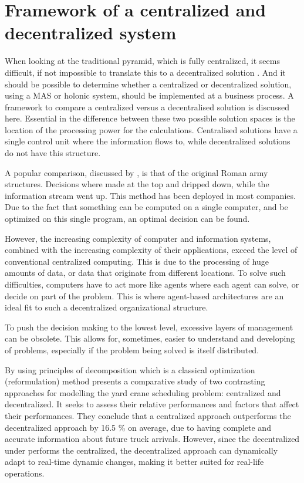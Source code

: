\section{Framework of a centralized and decentralized system}
When looking at the traditional pyramid, which is fully centralized, it seems difficult, if not impossible to translate this to a decentralized solution . And it should be possible to determine whether a centralized or decentralized solution, using a MAS or holonic system, should be implemented at a business process. A framework to compare a centralized versus a decentralised solution is discussed here. Essential in the difference between these two possible solution spaces is the location of the processing power for the calculations. Centralised solutions have a single control unit where the information flows to, while decentralized solutions do not have this structure.

A popular comparison, discussed by \citet{parunak1999industrial}, is that of the original Roman army structures. Decisions where made at the top and dripped down, while the information stream went up. This method has been deployed in most companies. Due to the fact that something can be computed on a single computer, and be optimized on this single program, an optimal decision can be found.

However, the increasing complexity of computer and information systems, combined with the increasing complexity of their applications, exceed the level of conventional centralized computing. This is due to the processing of huge amounts of data, or data that originate from different locations. To solve such difficulties, computers have to act more like agents where each agent can solve, or decide on part of the problem. This is where agent-based architectures are an ideal fit to such a decentralized organizational structure.

To push the decision making to the lowest level, excessive layers of management can be obsolete. This allows for, sometimes, easier to understand and developing of problems, especially if the problem being solved is itself distributed.

By using principles of decomposition which is a classical optimization (reformulation) method \citep{sharif2012yard} presents a comparative study of two contrasting approaches for modelling the yard crane scheduling problem: centralized and decentralized. It seeks to assess their relative performances and factors that affect their performances. They conclude that a centralized approach outperforms the decentralized approach by 16.5 \% on average, due to having complete and accurate information about future truck arrivals. However, since the decentralized under performs the centralized, the decentralized approach can dynamically adapt to real-time dynamic changes, making it better suited for real-life operations. 

